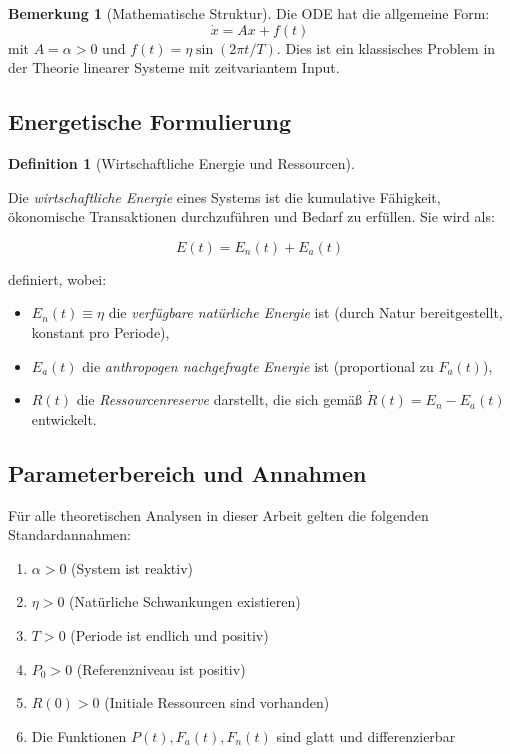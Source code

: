 \documentclass[a4paper, 12pt, twoside, openright]{report}
\theoremstyle{definition}
\newtheorem{definition}[theorem]{Definition}
\theoremstyle{definition}
\newtheorem{bemerkung}{Bemerkung}[chapter]
\begin{document}
\begin{bemerkung}[Mathematische Struktur]
    
    Die ODE hat die allgemeine Form:
    \begin{equation}
        \dot{x} = Ax + f(t)
    \end{equation}
    mit $A = \alpha > 0$ und $f(t) = \eta \sin(2\pi t / T)$. Dies ist ein klassisches Problem in der Theorie linearer Systeme mit zeitvariantem Input.
\end{bemerkung}

\subsection{Energetische Formulierung}

\begin{definition}[Wirtschaftliche Energie und Ressourcen]\label{def:energie}
    
    Die \emph{wirtschaftliche Energie} eines Systems ist die kumulative Fähigkeit, ökonomische Transaktionen durchzuführen und Bedarf zu erfüllen. Sie wird als:
    
    \begin{equation}
        E(t) = E_n(t) + E_a(t)
    \end{equation}
    
    definiert, wobei:
    \begin{itemize}
        \item $E_n(t) \equiv \eta$ die \emph{verfügbare natürliche Energie} ist (durch Natur bereitgestellt, konstant pro Periode),
        \item $E_a(t)$ die \emph{anthropogen nachgefragte Energie} ist (proportional zu $F_a(t)$),
        \item $R(t)$ die \emph{Ressourcenreserve} darstellt, die sich gemäß $\dot{R}(t) = E_n - E_a(t)$ entwickelt.
    \end{itemize}
\end{definition}

\subsection{Parameterbereich und Annahmen}

Für alle theoretischen Analysen in dieser Arbeit gelten die folgenden Standardannahmen:

\begin{enumerate}
    \item $\alpha > 0$ (System ist reaktiv)
    \item $\eta > 0$ (Natürliche Schwankungen existieren)
    \item $T > 0$ (Periode ist endlich und positiv)
    \item $P_0 > 0$ (Referenzniveau ist positiv)
    \item $R(0) > 0$ (Initiale Ressourcen sind vorhanden)
    \item Die Funktionen $P(t), F_a(t), F_n(t)$ sind glatt und differenzierbar
\end{enumerate}
\end{document}
